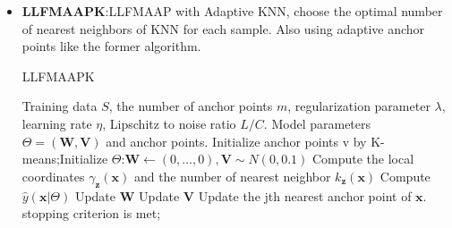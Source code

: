 \documentclass{article}
\begin{document}
\begin{itemize}
\begin{algorithm}[H]
	\end{algorithm}
	\item \textbf{LLFMAAPK}:LLFMAAP with Adaptive KNN, choose the optimal number of nearest neighbors of KNN for each sample. Also using adaptive anchor points like the former algorithm.
	\begin{algorithm}[H]
		\caption{LLFMAAPK}
		\begin{algorithmic}[1]
			\REQUIRE Training data $S$, the number of anchor points $m$, regularization parameter $\lambda$, learning rate $\eta$, Lipschitz to noise ratio $L/C$.
			\ENSURE Model parameters $\Theta = (\boldsymbol W, \boldsymbol V)$ and anchor points.
			\STATE Initialize anchor points v by K-means;Initialize $\Theta$:$\boldsymbol W\leftarrow(0,...,0),\boldsymbol V\sim N(0,0.1)$
			\REPEAT
			\STATE Compute the local coordinates $\gamma_{\boldsymbol{z}}(\boldsymbol{x})$ and the number of nearest neighbor $k_{\boldsymbol{z}}(\boldsymbol{x})$
			\STATE Compute $\hat{y}(\boldsymbol{x}|\Theta)$
			\STATE Update $\boldsymbol W$
			\STATE Update $\boldsymbol V$
			\STATE Update the jth nearest anchor point of $\boldsymbol{x}$.
			\ENDFOR
			\ENDFOR
			\UNTIL stopping criterion is met;
		\end{algorithmic}
	\end{algorithm}
\end{itemize}
\end{document}
